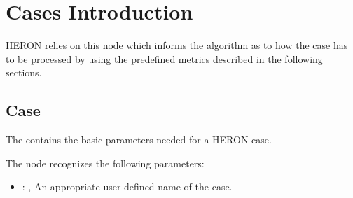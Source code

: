 \section{Cases Introduction}HERON relies on this  node which informs the algorithm as to how the case has to be processed by using the predefined metrics described in the following sections.




\subsection{Case}
  The  contains    the basic parameters needed for a HERON case.

  The  node recognizes the following parameters:
    \begin{itemize}
      \item {}: , 
        An appropriate user defined name of the case.
  \end{itemize}


